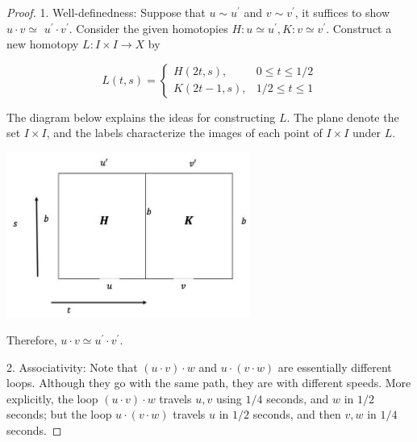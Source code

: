 \begin{proof} 1. Well-definedness: Suppose that \(u \sim  {u}^{\prime }\) and \(v \sim  {v}^{\prime }\), it suffices to show \(u \cdot  v \simeq\)  \({u}^{\prime } \cdot  {v}^{\prime }\). Consider the given homotopies \(H : u \simeq  {u}^{\prime },K : v \simeq  {v}^{\prime }\). Construct a new homotopy \(L : I \times  I \rightarrow  X\) by

\[
L\left( {t,s}\right)  = \left\{  \begin{array}{rr} H\left( {{2t},s}\right), & 0 \leq  t \leq  1/2 \\  K\left( {{2t} - 1,s}\right), & 1/2 \leq  t \leq  1 \end{array}\right.
\]

The diagram below explains the ideas for constructing \(L\). The plane denote the set \(I \times  I\), and the labels characterize the images of each point of \(I \times  I\) under \(L\). 
\begin{center}
\includegraphics[width=0.6\textwidth]{images/Ch7_well_defined_pi1.jpg}
\end{center}
Therefore, \(u \cdot  v \simeq  {u}^{\prime } \cdot  {v}^{\prime }\).

2. Associativity: Note that \(\left( {u \cdot  v}\right)  \cdot  w\) and \(u \cdot  \left( {v \cdot  w}\right)\) are essentially different loops. Although they go with the same path, they are with different speeds. More explicitly, the loop \(\left( {u \cdot  v}\right)  \cdot  w\) travels \(u,v\) using \(1/4\) seconds, and \(w\) in \(1/2\) seconds; but the loop \(u \cdot  \left( {v \cdot  w}\right)\) travels \(u\) in \(1/2\) seconds, and then \(v,w\) in \(1/4\) seconds.


\end{proof}
